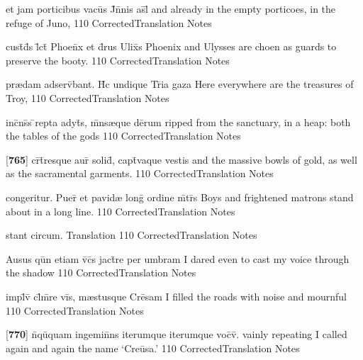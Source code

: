 \latline
  {et jam porticibus vacu\={\macron {\i}}s J\={}n\={}nis as\={}l\={}}
  { and already in the empty porticoes, in the refuge of Juno, }
  {110}
  { CorrectedTranslation }
  { Notes }


\latline
  {cust\={}d\={}s l\={}ct\={\macron {\i}} Phoen\={\macron {\i}}x et d\={\macron {\i}}rus Ulix\={}s}
  { Phoenix and Ulysses are choen as guards to preserve the booty. }
  {110}
  { CorrectedTranslation }
  { Notes }


\latline
  {pr{\ae}dam adserv\={}bant.  H\={}c undique Tr\={}ia gaza }
  { Here everywhere are the treasures of Troy, }
  {110}
  { CorrectedTranslation }
  { Notes }


\latline
  {inc\={}ns\={\macron {\i}}s \={}repta adyt\={\macron {\i}}s, m\={}ns{\ae}que de\={}rum}
  { ripped from the sanctuary, in a heap: both the tables of the gods }
  {110}
  { CorrectedTranslation }
  { Notes }


\latline
  {[\textbf{765}] cr\={}t\={}resque aur\={} solid\={\macron {\i}}, capt\={\macron {\i}}vaque vestis}
  { and the massive bowls of gold, as well as the sacramental garments. }
  {110}
  { CorrectedTranslation }
  { Notes }


\latline
  {congeritur.  Puer\={\macron {\i}} et pavid{\ae} long\={} ordine m\={}tr\={}s}
  { Boys and frightened matrons stand about in a long line. }
  {110}
  { CorrectedTranslation }
  { Notes }


\latline
  {stant circum.}
  { Translation }
  {110}
  { CorrectedTranslation }
  { Notes }


\latline
  {Ausus qu\={\macron {\i}}n etiam v\={}c\={}s jact\={}re per umbram}
  { I dared even to cast my voice through the shadow }
  {110}
  { CorrectedTranslation }
  { Notes }


\latline
  {impl\={}v\={\macron {\i}} cl\={}m\={}re vi\={}s, m{\ae}stusque Cre\={}sam}
  { I filled the roads with noise and mournful  }
  {110}
  { CorrectedTranslation }
  { Notes }


\latline
  {[\textbf{770}] n\={}qu\={\macron {\i}}quam ingemin\={}ns iterumque iterumque voc\={}v\={\macron {\i}}.}
  { vainly repeating I called again and again the name `Cre\={u}sa.' }
  {110}
  { CorrectedTranslation }
  { Notes }


